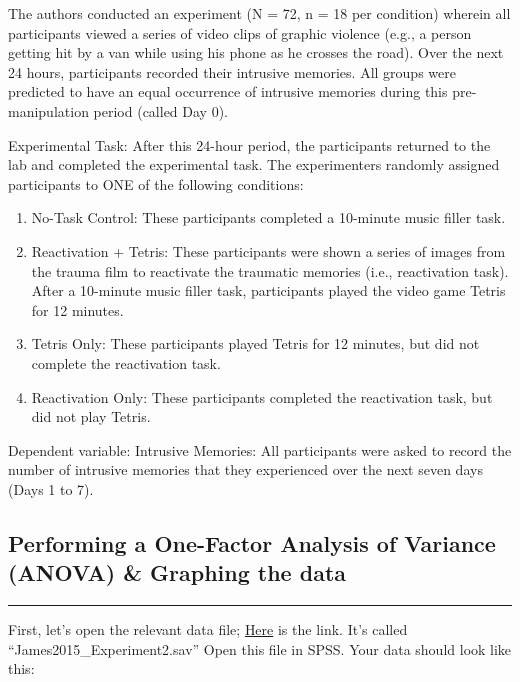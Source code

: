\documentclass[
]{book}
\providecommand{\tightlist}{%
  \setlength{\itemsep}{0pt}\setlength{\parskip}{0pt}}
\begin{document}
The authors conducted an experiment (N = 72, n = 18 per condition) wherein all participants viewed a series of video clips of graphic violence (e.g., a person getting hit by a van while using his phone as he crosses the road). Over the next 24 hours, participants recorded their intrusive memories. All groups were predicted to have an equal occurrence of intrusive memories during this pre-manipulation period (called Day 0).

Experimental Task: After this 24-hour period, the participants returned to the lab and completed the experimental task. The experimenters randomly assigned participants to ONE of the following conditions:

\begin{enumerate}
\def\labelenumi{\arabic{enumi}.}
\tightlist
\item
  No-Task Control: These participants completed a 10-minute music filler task.
\item
  Reactivation + Tetris: These participants were shown a series of images from the trauma film to reactivate the traumatic memories (i.e., reactivation task). After a 10-minute music filler task, participants played the video game Tetris for 12 minutes.
\item
  Tetris Only: These participants played Tetris for 12 minutes, but did not complete the reactivation task.
\item
  Reactivation Only: These participants completed the reactivation task, but did not play Tetris.
\end{enumerate}

Dependent variable: Intrusive Memories: All participants were asked to record the number of intrusive memories that they experienced over the next seven days (Days 1 to 7).

\hypertarget{performing-a-one-factor-analysis-of-variance-anova-graphing-the-data}{%
\subsection{Performing a One-Factor Analysis of Variance (ANOVA) \& Graphing the data}\label{performing-a-one-factor-analysis-of-variance-anova-graphing-the-data}}

\begin{center}\rule{0.5\linewidth}{0.5pt}\end{center}

First, let's open the relevant data file; \href{https://github.com/CrumpLab/statisticsLab/blob/master/data/spssdata/James2015_Experiment2.sav}{Here} is the link. It's called ``James2015\_Experiment2.sav'' Open this file in SPSS. Your data should look like this:
\end{document}
